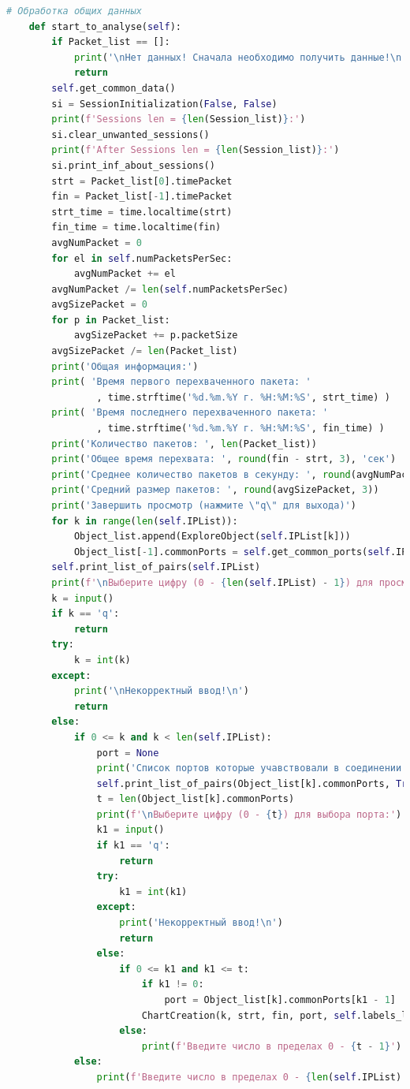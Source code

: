 \documentclass[bachelor, och, coursework]{SCWorks}
\begin{document}
\begin{lstlisting}[language=Python]
    # Обработка общих данных
    def start_to_analyse(self):
        if Packet_list == []:
            print('\nНет данных! Сначала необходимо получить данные!\n')
            return
        self.get_common_data()
        si = SessionInitialization(False, False)
        print(f'Sessions len = {len(Session_list)}:')
        si.clear_unwanted_sessions()
        print(f'After Sessions len = {len(Session_list)}:')
        si.print_inf_about_sessions()
        strt = Packet_list[0].timePacket
        fin = Packet_list[-1].timePacket
        strt_time = time.localtime(strt)
        fin_time = time.localtime(fin)
        avgNumPacket = 0
        for el in self.numPacketsPerSec:
            avgNumPacket += el
        avgNumPacket /= len(self.numPacketsPerSec)
        avgSizePacket = 0
        for p in Packet_list:
            avgSizePacket += p.packetSize
        avgSizePacket /= len(Packet_list)
        print('Общая информация:')
        print( 'Время первого перехваченного пакета: '
                , time.strftime('%d.%m.%Y г. %H:%M:%S', strt_time) )
        print( 'Время последнего перехваченного пакета: '
                , time.strftime('%d.%m.%Y г. %H:%M:%S', fin_time) )
        print('Количество пакетов: ', len(Packet_list))
        print('Общее время перехвата: ', round(fin - strt, 3), 'сек')
        print('Среднее количество пакетов в секунду: ', round(avgNumPacket, 3))
        print('Средний размер пакетов: ', round(avgSizePacket, 3))
        print('Завершить просмотр (нажмите \"q\" для выхода)')
        for k in range(len(self.IPList)):
            Object_list.append(ExploreObject(self.IPList[k]))
            Object_list[-1].commonPorts = self.get_common_ports(self.IPList[k])
        self.print_list_of_pairs(self.IPList)
        print(f'\nВыберите цифру (0 - {len(self.IPList) - 1}) для просмотра IP-адреса:')
        k = input()
        if k == 'q':
            return
        try:
            k = int(k)
        except:
            print('\nНекорректный ввод!\n')
            return
        else:
            if 0 <= k and k < len(self.IPList):
                port = None
                print('Список портов которые учавствовали в соединении с данным IP-адресом')
                self.print_list_of_pairs(Object_list[k].commonPorts, True)
                t = len(Object_list[k].commonPorts)
                print(f'\nВыберите цифру (0 - {t}) для выбора порта:')
                k1 = input()
                if k1 == 'q':
                    return
                try:
                    k1 = int(k1)
                except:
                    print('Некорректный ввод!\n')
                    return
                else:
                    if 0 <= k1 and k1 <= t:
                        if k1 != 0:
                            port = Object_list[k].commonPorts[k1 - 1]
                        ChartCreation(k, strt, fin, port, self.labels_list).start_to_plot()
                    else:
                        print(f'Введите число в пределах 0 - {t - 1}')
            else:
                print(f'Введите число в пределах 0 - {len(self.IPList) - 1}')
    \end{lstlisting}
\end{document}

